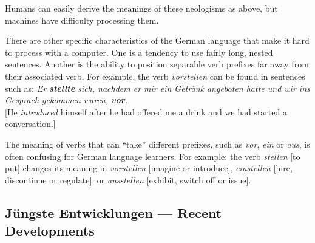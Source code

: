 \documentclass[]{../../metanetpaper}
\begin{document}
\begin{Parallel}[c]{80mm}{80mm}
{    Humans can easily derive the meanings of these neologisms as above, but machines have difficulty processing them. 

    There are other specific characteristics of the German language that make it hard to process with a computer. One is a tendency to use fairly long, nested sentences. Another is the ability to position separable verb prefixes far away from their associated verb. For example, the verb \textit{vorstellen} can be found in sentences such as:
    \textit{Er \textbf{stellte} sich, nachdem er mir ein Getränk angeboten hatte und wir ins Gespräch gekommen waren, \textbf{vor}.}\\

    {[}He \textit{introduced} himself after he had offered me a drink and we had started a conversation.{]}

    The meaning of verbs that can “take” different prefixes, such as \textit{vor}, \textit{ein} or \textit{aus}, is often confusing for German language learners. For example: the verb \textit{stellen} {[}to put] changes its meaning in \textit{vorstellen} {[}imagine or introduce{]}, \textit{einstellen} {[}hire, discontinue or regulate{]}, or \textit{ausstellen} {[}exhibit, switch off or issue{]}.
  }

  \ParallelPar


  \subsection{Jüngste Entwicklungen --- Recent Developments}

\end{Parallel}
\end{document}
